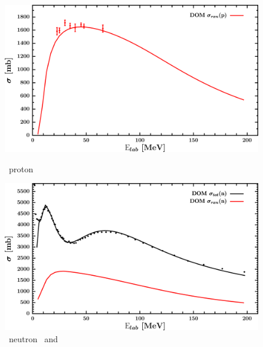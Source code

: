 \begin{figure}[hbtp]
    \centering
    \begin{minipage}{0.47\textwidth}
        \centering
        \includegraphics[width=\linewidth]{figures/sn124_protonInelastic.png}
        \caption*{\snFour\ proton \rxn}
        \label{DOMFitData_sn124_proton_inelastic}
    \end{minipage}\hspace{6pt}
    \begin{minipage}{0.47\textwidth}
        \centering
        \includegraphics[width=\textwidth]{figures/sn124_neutronInelastic.png}
        \caption*{\snFour\ neutron \rxn\ and \tot}
        \label{DOMFitData_sn124_neutron_inelastic}
    \end{minipage}
\end{figure}
\afterpage{\clearpage}
